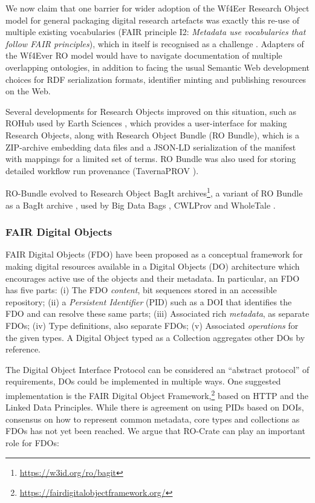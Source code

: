 We now claim that one barrier for wider adoption of the Wf4Eer Research
Object model for general packaging digital research artefacts was
exactly this re-use of multiple existing vocabularies (FAIR principle
I2: \emph{Metadata use vocabularies that follow FAIR principles}), which
in itself is recognised as a challenge
\cite{ch5-67}. Adapters
of the Wf4Ever RO model would have to navigate documentation of multiple
overlapping ontologies, in addition to facing the usual Semantic Web
development choices for RDF serialization formats, identifier minting
and publishing resources on the Web.

Several developments for Research Objects improved on this situation,
such as ROHub used by Earth Sciences
\cite{ch5-48}, which provides a
user-interface for making Research Objects, along with Research Object
Bundle \cite{ch5-111} (RO
Bundle), which is a ZIP-archive embedding data files and a JSON-LD
serialization of the manifest with mappings for a limited set of terms.
RO Bundle was also used for storing detailed workflow run provenance
(TavernaPROV
\cite{Soiland-Reyes 2016}).

RO-Bundle evolved to Research Object
BagIt archives\footnote{\url{https://w3id.org/ro/bagit}}, a variant of RO Bundle as a BagIt archive
\cite{ch5-74}, used by Big Data Bags
\cite{Chard 2016},
CWLProv \cite{Khan 2019} and
WholeTale \cite{ch5-76,Chard 2019}.

\subsubsection{FAIR Digital Objects}\label{ch5:fair-digital-objects}

FAIR Digital Objects (FDO)
\cite{De Smedt 2020} have been
proposed as a conceptual framework for making digital resources
available in a Digital Objects (DO) architecture which encourages active
use of the objects and their metadata. In particular, an FDO has five
parts: (i) The FDO \emph{content}, bit sequences stored in an accessible
repository; (ii) a \emph{Persistent Identifier} (PID) such as a DOI that
identifies the FDO and can resolve these same parts; (iii) Associated
rich \emph{metadata}, as separate FDOs; (iv) Type definitions, also
separate FDOs; (v) Associated \emph{operations} for the given types. A
Digital Object typed as a Collection aggregates other DOs by reference.

The Digital Object Interface Protocol \cite{DONA 2018}
can be considered an ``abstract protocol'' of requirements, DOs could be
implemented in multiple ways. One suggested implementation is the 
FAIR Digital Object
Framework,\footnote{\url{https://fairdigitalobjectframework.org/}} based on HTTP and the Linked Data Principles. While there is
agreement on using PIDs based on DOIs, consensus on how to represent
common metadata, core types and collections as FDOs has not yet been
reached. We argue that RO-Crate can play an important role for FDOs:

